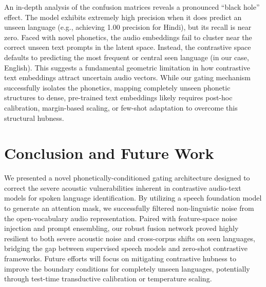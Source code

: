\documentclass[conference]{IEEEtran}
\begin{document}
An in-depth analysis of the confusion matrices reveals a pronounced ``black hole'' effect. The model exhibits extremely high precision when it does predict an unseen language (e.g., achieving 1.00 precision for Hindi), but its recall is near zero. Faced with novel phonetics, the audio embeddings fail to cluster near the correct unseen text prompts in the latent space. Instead, the contrastive space defaults to predicting the most frequent or central seen language (in our case, English). This suggests a fundamental geometric limitation in how contrastive text embeddings attract uncertain audio vectors. While our gating mechanism successfully isolates the phonetics, mapping completely unseen phonetic structures to dense, pre-trained text embeddings likely requires post-hoc calibration, margin-based scaling, or few-shot adaptation to overcome this structural hubness.

\section{Conclusion and Future Work}
We presented a novel phonetically-conditioned gating architecture designed to correct the severe acoustic vulnerabilities inherent in contrastive audio-text models for spoken language identification. By utilizing a speech foundation model to generate an attention mask, we successfully filtered non-linguistic noise from the open-vocabulary audio representation. Paired with feature-space noise injection and prompt ensembling, our robust fusion network proved highly resilient to both severe acoustic noise and cross-corpus shifts on seen languages, bridging the gap between supervised speech models and zero-shot contrastive frameworks. Future efforts will focus on mitigating contrastive hubness to improve the boundary conditions for completely unseen languages, potentially through test-time transductive calibration or temperature scaling.



\end{document}
